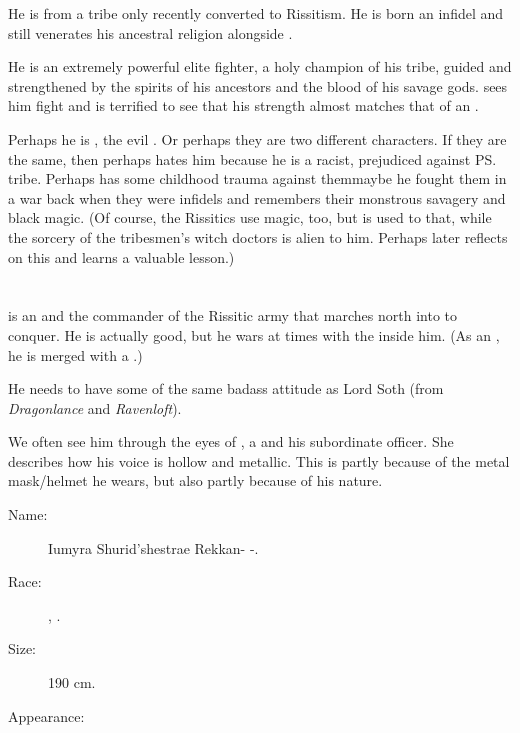 He is from a \Durcaci{} tribe only recently converted to Rissitism. He is born an infidel and still venerates his ancestral religion alongside \Nechsain. 

He is an extremely powerful elite fighter, a holy champion of his tribe, guided and strengthened by the spirits of his ancestors and the blood of his savage gods. \Shilred{} sees him fight and is terrified to see that his strength almost matches that of an \Ashenoch. 

Perhaps he is \Geldashad, the evil \Ashenoch. Or perhaps they are two different characters. If they are the same, then perhaps \Narkiza{} hates him because he is a racist, prejudiced against \ps{\KarsaOrlong} tribe. Perhaps \Narkiza{} has some childhood trauma against them\dash maybe he fought them in a war back when they were infidels and remembers their monstrous savagery and black magic. (Of course, the Rissitics use  magic, too, but \Narkiza{} is used to that, while the sorcery of the tribesmen's witch doctors is alien to him. Perhaps \Narkiza{} later reflects on this and learns a valuable lesson.)
















\section{\Narkiza}
\index{\Narkiza}
\Narkiza{} is an \Ashenoch{} and the commander of the Rissitic army that marches north into \Velcad{} to conquer. 
He is actually good, but he wars at times with the \shadowcreature{} inside him. 
(As an \Ashenoch, he is merged with a \shadowcreature.)

He needs to have some of the same badass attitude as Lord Soth (from \emph{Dragonlance} and \emph{Ravenloft}). 

We often see him through the eyes of \Kufur, a \sphyle{} and his subordinate officer. 
She describes how his voice is hollow and metallic. 
This is partly because of the metal mask/helmet he wears, but also partly because of his \mdaemonic{} \Ashenoch{} nature. 

\begin{description}
  \item[Name:] \Narkiza{} Iumyra Shurid'shestrae Rekkan-\Neftzaid{} \Ashenoch-\Hashkfed.
  \item[Race:] \Scatha, \Ashenoch{}. 
  \item[Size:] 190 cm. 
  \item[Appearance:] 
\end{description}









